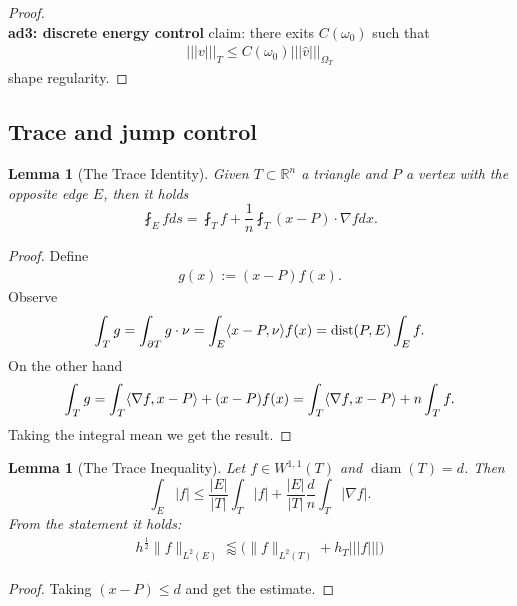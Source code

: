\documentclass[a4paper,12pt,oneside,fleqn]{book}
\newtheorem{lemma}[theorem]{Lemma}
\theoremstyle{definition}
\theoremstyle{remark}
\let\div\relax
\DeclareMathOperator{\div}{div}
\DeclareMathOperator*{\dist}{dist}
\DeclareMathOperator*{\diam}{diam}
\begin{document}
\begin{proof}
\quad\\
\textbf{ad3: discrete energy control} claim:  there exits $C(\omega_0)$ such that 
\begin{align*}
	|||v|||_T \le C(\omega_0) |||\hat{v}|||_{\Omega_T}
\end{align*}
shape regularity.
\end{proof}




\subsection{Trace and jump control}
\begin{lemma}[The Trace Identity]
	Given $T \subset \mathbb{R}^n$ a triangle and $P$ a vertex with the opposite edge $E$, then it holds
	\begin{equation}
		\fint_E f ds = \fint_T f + \frac{1}{n} \fint_T (x - P) \cdot \nabla f dx.
	\end{equation}
\end{lemma}
\begin{proof}
Define
\begin{align*}
	g(x) := (x - P) f(x).
\end{align*}
Observe
\begin{align*}
	\int_T \div g = \int_{\partial T} g \cdot \nu  = \int_E \langle x - P, \nu \rangle f(x) = \dist(P, E) \int_E f.
\end{align*}
On the other hand 
\begin{align*}
	\int_T \div g = \int_T \langle \nabla f, x - P \rangle + \div(x- P) f(x) = \int_T \langle \nabla f, x - P\rangle + n \int_T f. 
\end{align*}
Taking the integral mean we get the result. 
	
\end{proof}

\begin{lemma}[The Trace Inequality]
	Let $f \in W^{1, 1}(T)$ and $\diam(T) = d$. Then
	\begin{equation}
		\int_E|f|  \le \frac{|E|}{|T|} \int_T |f| + \frac{|E|}{|T|} \frac{d}{n} \int_T |\nabla f|.
	\end{equation}
	From the statement it holds:
	\begin{align*}
		h^{\frac{1}{2}}\|f\|_{L^2(E)} \lessapprox \bigg(  \| f\|_{L^2(T)} + h_T |||f||| \bigg)
	\end{align*}
\end{lemma}
\begin{proof}
Taking $(x - P) \le d$ and get the estimate. 
\end{proof}
\end{document}

